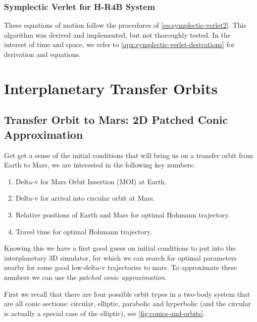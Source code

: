 \subsubsection{Symplectic Verlet for H-R4B System}

These equations of motion follow the procedures of \cref{eq:symplectic-verlet2}. This algorithm was derived and implemented, but not thoroughly tested. In the interest of time and space, we refer to \cref{apx:symplectic-verlet-derivations} for derivation and equations.

\section{Interplanetary Transfer Orbits}

\subsection{Transfer Orbit to Mars: 2D Patched Conic Approximation} \label{sec:2d-patched-conic}
Get get a sense of the initial conditions that will bring us on a transfer orbit from Earth to Mars, we are interested in the following key numbers:
\begin{enumerate}
	\item Delta-v for Mars Orbit Insertion (MOI) at Earth.
	\item Delta-v for arrival into circular orbit at Mars.
	\item Relative positions of Earth and Mars for optimal Hohmann trajectory.
	\item Travel time for optimal Hohmann trajectory.
\end{enumerate}

Knowing this we have a first good guess on initial conditions to put into the interplanetary 3D simulator, for which we can search for optimal parameters nearby for some good low-delta-v trajectories to mars. To approximate these numbers we can use the \emph{patched conic approximation}.

First we recall that there are four possible orbit types in a two-body system that are all conic sections: circular, elliptic, parabolic and hyperbolic (and the circular is actually a special case of the elliptic), see \cref{fig:conics-and-orbits}.


